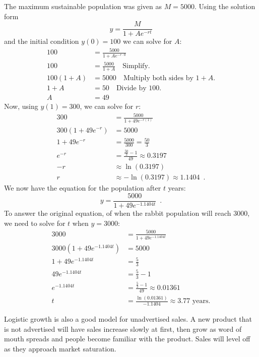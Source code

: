 \begin{example}
\begin{solution}
The maximum sustainable population was given as $M=5000$. Using the solution form
$$y=\frac{M}{1+Ae^{-rt}}$$
and the initial condition $y(0)=100$ we can solve for $A$:
\begin{align*}
  100       &= \frac{5000}{1+Ae^{-r\cdot 0}} \\
  100       &= \frac{5000}{1+A} \quad \text{Simplify.}\\
  100(1+A)  &= 5000 \quad \text{Multiply both sides by } 1+A.\\
  1+A       &= 50 \quad \text{Divide by 100.}\\
  A         &= 49
\end{align*}
Now, using $y(1)=300$, we can solve for $r$:
\begin{align*}
 300 &= \frac{5000}{1+49e^{-r(1)}} \\
 300(1+49e^{-r}) &= 5000\\
 1+49e^{-r} &= \frac{5000}{300} = \frac{50}{3}\\
 e^{-r} &= \frac{\frac{50}{3}-1}{49} \approx 0.3197 \\
 -r &\approx \ln(0.3197)\\
 r &\approx -\ln(0.3197)\approx   1.1404 \enspace .
\end{align*}
We now have the equation for the population after $t$ years:
$$y = \frac{5000}{1+49 e^{-1.1404t}} \enspace .$$
To answer the original equation, of when the rabbit population will reach 3000, we need to solve for $t$ when $y=3000$:
\begin{align*}
  3000                              &= \frac{5000}{1+49e^{-1.1404t}} \\
  3000\left(1+49e^{-1.1404t}\right) &= 5000\\
  1+49e^{-1.1404t}                  &= \frac{5}{3}\\
  49e^{-1.1404t}                    &= \frac{5}{3} - 1\\
  e^{-1.1404t}                      &= \frac{\frac{5}{3}-1}{49} \approx  0.01361 \\
  t                                 &= \frac{\ln(0.01361)}{-1.1404}\approx   3.77 \text{ years}.
\end{align*}
\end{solution}\end{example}

Logistic growth is also a good model for unadvertised sales. A new product that is not advertised will have sales increase slowly at first, then grow as word of mouth spreads and people become familiar with the product. Sales will level off as they approach market saturation.
